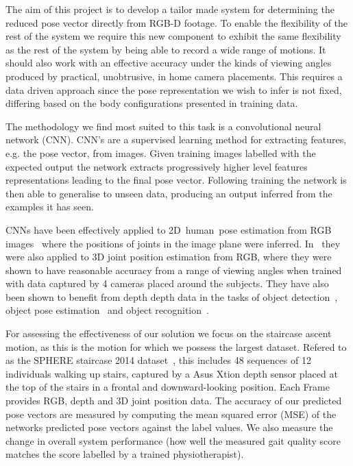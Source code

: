 \documentclass[11pt]{article} %
\begin{document}
The aim of this project is to develop a tailor made system for determining the reduced pose vector directly from RGB-D footage. To enable the flexibility of the rest of the system we require this new component to exhibit the same flexibility as the rest of the system by being able to record a wide range of motions. It should also work with an effective accuracy under the kinds of viewing angles produced by practical, unobtrusive, in home camera placements. This requires a data driven approach since the pose representation we wish to infer is not fixed, differing based on the body configurations presented in training data. %

The methodology we find most suited to this task is a convolutional neural network (CNN). CNN's are a supervised learning method for extracting features, e.g. the pose vector, from images. Given training images labelled with the expected output the network extracts progressively higher level features representations leading to the final pose vector. Following training the network is then able to generalise to unseen data, producing an output inferred from the examples it has seen. 

CNNs have been effectively applied to 2D~human~pose estimation from RGB images~\cite{Toshev,Pfister,Li2014,Jain2013a,Jain2014,Tompson,Tompson2014} where the positions of joints in the image plane were inferred. In~\cite{Accv2014} they were also applied to 3D joint position estimation from RGB, where they were shown to have reasonable accuracy from a range of viewing angles when trained with data captured by 4 cameras placed around the subjects. They have also been shown to benefit from depth depth data in the tasks of object detection~\cite{Gupta2014}, object pose estimation~\cite{Schwarz2015} and object recognition~\cite{Alexandre2013}. %

For assessing the effectiveness of our solution we focus on the staircase ascent motion, as this is the motion for which we possess the largest dataset. Refered to as the SPHERE staircase 2014 dataset~\cite{Paiement}, this includes 48 sequences of 12 individuals walking up stairs, captured by a Asus Xtion depth sensor placed at the top of the stairs in a frontal and downward-looking position. Each Frame provides RGB, depth and 3D joint position data. The accuracy of our predicted pose vectors are measured by computing the mean squared error (MSE) of the networks predicted pose vectors against the label values. We also measure the change in overall system performance (how well the measured gait quality score matches the score labelled by a trained physiotherapist). 
\end{document}
